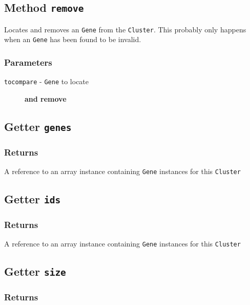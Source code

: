 \subsection*{Method \texttt{remove}\label{Method_remove}}


Locates and removes an \texttt{Gene} from the \texttt{Cluster}. This probably only happens
when an \texttt{Gene} has been found to be invalid.

\subsubsection*{Parameters\label{Parameters}}
\begin{description}

\item[{\texttt{tocompare} - \texttt{Gene} to locate}] \textbf{and remove}\end{description}
\subsection*{Getter \texttt{genes}\label{Getter_genes}}
\subsubsection*{Returns\label{Returns}}


A reference to an array instance containing \texttt{Gene} instances for this \texttt{Cluster}

\subsection*{Getter \texttt{ids}\label{Getter_ids}}
\subsubsection*{Returns\label{Returns}}


A reference to an array instance containing \texttt{Gene} instances for this \texttt{Cluster}

\subsection*{Getter \texttt{size}\label{Getter_size}}
\subsubsection*{Returns\label{Returns}}


